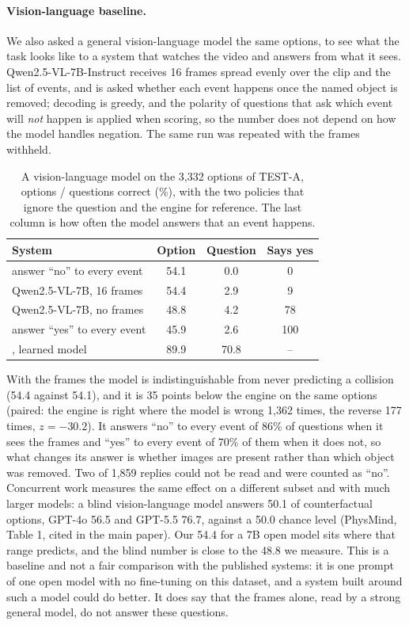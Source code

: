 \paragraph{Vision-language baseline.}
We also asked a general vision-language model the same options, to see what the task looks like to a system that watches the video and answers from what it sees.
Qwen2.5-VL-7B-Instruct receives 16 frames spread evenly over the clip and the list of events, and is asked whether each event happens once the named object is removed; decoding is greedy, and the polarity of questions that ask which event will \emph{not} happen is applied when scoring, so the number does not depend on how the model handles negation.
The same run was repeated with the frames withheld.

\begin{table}[h]
\caption{A vision-language model on the 3,332 options of TEST-A, options / questions correct (\%), with the two policies that ignore the question and the engine for reference. The last column is how often the model answers that an event happens.}
\label{tab:vlm}
\centering
\small
\begin{tabular}{@{}lccc@{}}
\toprule
System & Option & Question & Says yes \\
\midrule
answer ``no'' to every event & 54.1 & 0.0 & 0 \\
Qwen2.5-VL-7B, 16 frames & 54.4 & 2.9 & 9 \\
Qwen2.5-VL-7B, no frames & 48.8 & 4.2 & 78 \\
answer ``yes'' to every event & 45.9 & 2.6 & 100 \\
\midrule
\sys{}, learned model & 89.9 & 70.8 & -- \\
\bottomrule
\end{tabular}
\end{table}

With the frames the model is indistinguishable from never predicting a collision (54.4 against 54.1), and it is 35 points below the engine on the same options (paired: the engine is right where the model is wrong 1,362 times, the reverse 177 times, $z = -30.2$).
It answers ``no'' to every event of 86\% of questions when it sees the frames and ``yes'' to every event of 70\% of them when it does not, so what changes its answer is whether images are present rather than which object was removed.
Two of 1,859 replies could not be read and were counted as ``no''.
Concurrent work measures the same effect on a different subset and with much larger models: a blind vision-language model answers 50.1 of counterfactual options, GPT-4o 56.5 and GPT-5.5 76.7, against a 50.0 chance level (PhysMind, Table 1, cited in the main paper).
Our 54.4 for a 7B open model sits where that range predicts, and the blind number is close to the 48.8 we measure.
This is a baseline and not a fair comparison with the published systems: it is one prompt of one open model with no fine-tuning on this dataset, and a system built around such a model could do better.
It does say that the frames alone, read by a strong general model, do not answer these questions.

